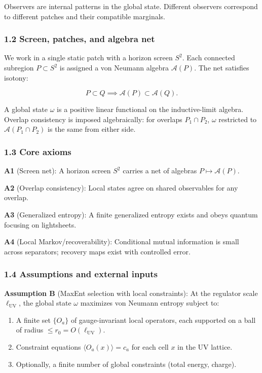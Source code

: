 Observers are internal patterns in the global state. Different observers correspond to different patches and their compatible marginals.

\subsubsection{1.2 Screen, patches, and algebra net}\label{12-screen-patches-and-algebra-net}

We work in a single static patch with a horizon screen \(S^2\). Each connected subregion \(P \subset S^2\) is assigned a von Neumann algebra \(\mathcal{A}(P)\). The net satisfies isotony:

\[
P \subset Q \implies \mathcal{A}(P) \subset \mathcal{A}(Q).
\]

A global state \(\omega\) is a positive linear functional on the inductive-limit algebra. Overlap consistency is imposed algebraically: for overlaps \(P_1 \cap P_2\), \(\omega\) restricted to \(\mathcal{A}(P_1 \cap P_2)\) is the same from either side.

\subsubsection{1.3 Core axioms}\label{13-core-axioms}

\textbf{A1} (Screen net): A horizon screen \(S^2\) carries a net of algebras \(P \mapsto \mathcal{A}(P)\).

\textbf{A2} (Overlap consistency): Local states agree on shared observables for any overlap.

\textbf{A3} (Generalized entropy): A finite generalized entropy exists and obeys quantum focusing on lightsheets.

\textbf{A4} (Local Markov/recoverability): Conditional mutual information is small across separators; recovery maps exist with controlled error.

\subsubsection{1.4 Assumptions and external inputs}\label{14-assumptions-and-external-inputs}

\textbf{Assumption B} (MaxEnt selection with local constraints): At the regulator scale \(\ell_{\mathrm{UV}}\), the global state \(\omega\) maximizes von Neumann entropy subject to:

\begin{enumerate}
\def\labelenumi{\arabic{enumi}.}
\tightlist
\item
  A finite set \(\{O_a\}\) of gauge-invariant local operators, each supported on a ball of radius \(\le r_0 = O(\ell_{\mathrm{UV}})\).
\item
  Constraint equations \(\langle O_a(x) \rangle = c_a\) for each cell \(x\) in the UV lattice.
\item
  Optionally, a finite number of global constraints (total energy, charge).
\end{enumerate}

